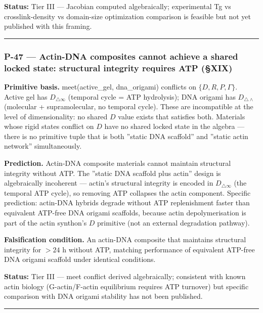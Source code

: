\documentclass[12pt,a4paper]{article}
\begin{document}
\textbf{Status:} Tier III --- Jacobian computed algebraically; experimental Tg vs crosslink-density vs domain-size optimization comparison is feasible but not yet published with this framing.

\begin{center}
\rule{0.5\textwidth}{0.4pt}
\end{center}

\subsubsection{P-47 --- Actin-DNA composites cannot achieve a shared locked state: structural integrity requires ATP (§XIX)}

\textbf{Primitive basis.} meet(active\_gel, dna\_origami) conflicts on $\{D, R, P, \Gamma\}$. Active gel has $D_{\triangle\infty}$ (temporal cycle = ATP hydrolysis); DNA origami has $D_{\triangle\wedge}$ (molecular + supramolecular, no temporal cycle). These are incompatible at the level of dimensionality: no shared $D$ value exists that satisfies both. Materials whose rigid states conflict on $D$ have no shared locked state in the algebra --- there is no primitive tuple that is both ''static DNA scaffold'' and ''static actin network'' simultaneously.

\textbf{Prediction.} Actin-DNA composite materials cannot maintain structural integrity without ATP. The ''static DNA scaffold plus actin'' design is algebraically incoherent --- actin's structural integrity is encoded in $D_{\triangle\infty}$ (the temporal ATP cycle), so removing ATP collapses the actin component. Specific prediction: actin-DNA hybrids degrade without ATP replenishment faster than equivalent ATP-free DNA origami scaffolds, because actin depolymerisation is part of the actin synthon's $D$ primitive (not an external degradation pathway).

\textbf{Falsification condition.} An actin-DNA composite that maintains structural integrity for $> 24$ h without ATP, matching performance of equivalent ATP-free DNA origami scaffold under identical conditions.

\textbf{Status:} Tier III --- meet conflict derived algebraically; consistent with known actin biology (G-actin/F-actin equilibrium requires ATP turnover) but specific comparison with DNA origami stability has not been published.

\begin{center}
\rule{0.5\textwidth}{0.4pt}
\end{center}
\end{document}
